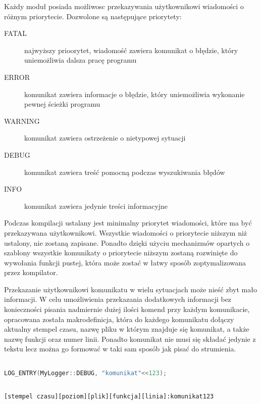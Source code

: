 Każdy moduł posiada możliwosc przekazywania użytkownikowi wiadomości o
różnym priorytecie. Dozwolone są następujące priorytety:

\begin{description}
\item[FATAL] najwyższy prioorytet, wiadomość zawiera komunikat o
  błędzie, który uniemożliwia dalsza pracę programu
\item[ERROR] komunikat zawiera informacje o błędzie, który uniemożliwia
  wykonanie pewnej ścieżki programu
\item[WARNING] komunikat zawiera ostrzeżenie o nietypowej sytuacji
\item[DEBUG] komunikat zawiera treść pomocną podczas wyszukiwania błędów
\item[INFO] komunikat zawiera jedynie treści informacyjne
\end{description}

Podczas kompilacji ustalany jest minimalny priorytet wiadomości, które
ma być przekazywana użytkownikowi. Wszystkie wiadomości o priorytecie
niższym niż ustalony, nie zostaną zapisane. Ponadto dzięki użyciu
mechanizmów opartych o szablony wszystkie komunikaty o priorytecie
niższym zostaną rozwinięte do wywołania funkcji pustej, która może
zostać w łatwy sposób zoptymalizowana przez kompilator.

Przekazanie użytkownikowi komunikatu w wielu sytuacjach może nieść
zbyt mało informacji. W celu umożliwienia przekazania dodatkowych
informacji bez konieczności pisania nadmiernie dużej ilości komend
przy każdym komunikacie, opracowana została makrodefinicja, która do
każdego komunikatu dołączy aktualny stempel czasu, nazwę pliku w
którym znajduje się komunikat, a także nazwę funkcji oraz numer
linii. Ponadto komunikat nie musi się składać jedynie z tekstu lecz
można go formować w taki sam sposób jak pisać do strumienia.

\vspace{0.5cm}
\begin{minipage}{\textwidth}
\begin{lstlisting}[language=c++ , caption=Przykładowe wypisanie komunikatu]

LOG_ENTRY(MyLogger::DEBUG, "komunikat"<<123);

\end{lstlisting}
\end{minipage}
\vspace{0.5cm}

\vspace{0.5cm}
\begin{minipage}{\textwidth}
\begin{lstlisting}[caption=Format komunikatu przekazywanego użytkownikowi]

[stempel czasu][poziom][plik][funkcja][linia]:komunikat123

\end{lstlisting}
\end{minipage}
\vspace{0.5cm}

